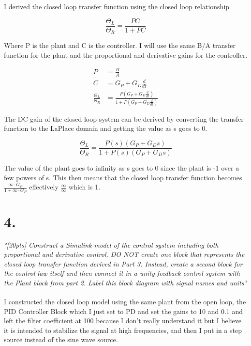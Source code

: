 \documentclass{article}
\begin{document}
I derived the closed loop transfer function using the closed loop relationship

\[
\frac{\Theta_L}{\Theta_R}=\frac{PC}{1+PC}
\]

Where P is the plant and C is the controller.
I will use the same B/A transfer function for the plant and the proportional and derivative gains for the controller.

\begin{align*}
    P &= \frac{B}{A} \\
    C &= G_P+G_D\frac{d}{dt} \\
    \frac{\Theta_L}{\Theta_R}&=\frac{P(G_P+G_D\frac{d}{dt})}{1+P(G_P+G_D\frac{d}{dt})}
\end{align*}

The DC gain of the closed loop system can be derived by converting the transfer function to the LaPlace domain and getting the value as s goes to 0.

\[
\frac{\Theta_L}{\Theta_R}=\frac{P(s)(G_P+G_Ds)}{1+P(s)(G_P+G_Ds)}
\]

The value of the plant goes to infinity as s goes to 0 since the plant is -1 over a few powers of s.
This then means that the closed loop transfer function becomes $\frac{\infty \cdot G_P}{1 + \infty \cdot G_P}$ effectively $\frac{\infty}{\infty}$ which is 1.

\section*{4.}

\textit{
    "[20pts] Construct a Simulink model of the control system including both proportional and
    derivative control. DO NOT create one block that represents the closed loop transfer function
    derived in Part 3. Instead, create a second block for the control law itself and then connect it in a
    unity-feedback control system with the Plant block from part 2. Label this block diagram with
    signal names and units"
}
\\
\\
I constructed the closed loop model using the same plant from the open loop, the PID Controller Block which I just set to PD and set the gains to 10 and 0.1 and left the filter coefficient at 100 because I don't really understand it but I believe it is intended to stabilize the signal at high frequencies, and then I put in a step source instead of the sine wave source.
\end{document}
